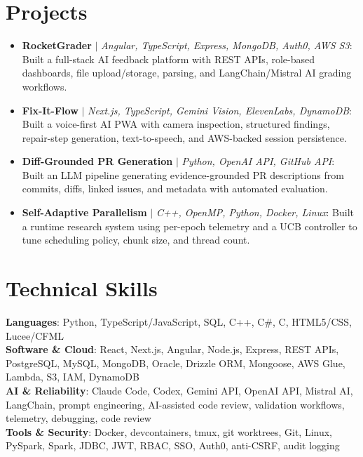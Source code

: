 \documentclass[letterpaper,11pt]{article}
\begin{document}
\section{Projects}
\begin{itemize}[leftmargin=0.15in, label={}, itemsep=1pt, topsep=1pt, parsep=0pt]
  \item\small{\textbf{RocketGrader} $|$ \emph{Angular, TypeScript, Express, MongoDB, Auth0, AWS S3}: Built a full-stack AI feedback platform with REST APIs, role-based dashboards, file upload/storage, parsing, and LangChain/Mistral AI grading workflows.}
  \item\small{\textbf{Fix-It-Flow} $|$ \emph{Next.js, TypeScript, Gemini Vision, ElevenLabs, DynamoDB}: Built a voice-first AI PWA with camera inspection, structured findings, repair-step generation, text-to-speech, and AWS-backed session persistence.}
  \item\small{\textbf{Diff-Grounded PR Generation} $|$ \emph{Python, OpenAI API, GitHub API}: Built an LLM pipeline generating evidence-grounded PR descriptions from commits, diffs, linked issues, and metadata with automated evaluation.}
  \item\small{\textbf{Self-Adaptive Parallelism} $|$ \emph{C++, OpenMP, Python, Docker, Linux}: Built a runtime research system using per-epoch telemetry and a UCB controller to tune scheduling policy, chunk size, and thread count.}
\end{itemize}\vspace{-7pt}

\section{Technical Skills}
 \begin{itemize}[leftmargin=0.15in, label={}]
    \small{\item{
     \textbf{Languages}{: Python, TypeScript/JavaScript, SQL, C++, C\#, C, HTML5/CSS, Lucee/CFML} \\
     \textbf{Software \& Cloud}{: React, Next.js, Angular, Node.js, Express, REST APIs, PostgreSQL, MySQL, MongoDB, Oracle, Drizzle ORM, Mongoose, AWS Glue, Lambda, S3, IAM, DynamoDB} \\
     \textbf{AI \& Reliability}{: Claude Code, Codex, Gemini API, OpenAI API, Mistral AI, LangChain, prompt engineering, AI-assisted code review, validation workflows, telemetry, debugging, code review} \\
     \textbf{Tools \& Security}{: Docker, devcontainers, tmux, git worktrees, Git, Linux, PySpark, Spark, JDBC, JWT, RBAC, SSO, Auth0, anti-CSRF, audit logging}
    }}
 \end{itemize}
\end{document}
